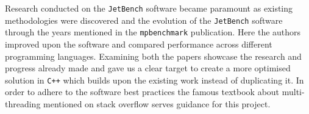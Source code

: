 Research conducted on the \texttt{JetBench} software became paramount as existing methodologies were discovered and the evolution of the \texttt{JetBench} software through the years mentioned in the \texttt{mpbenchmark} publication\cite{mpbenchmark_paper}. Here the authors improved upon the software and compared performance across different programming languages. Examining both the papers\cite{JetBench_paper}\cite{mpbenchmark_paper} showcase the research and progress already made and gave us a clear target to create a more optimised solution in \texttt{C++} which builds upon the existing work instead of duplicating it. In order to adhere to the software best practices the famous textbook about multi-threading\cite{c++_concurrency_in_action} mentioned on stack overflow\cite{c++_books_stackoverflow} serves guidance for this project. 

